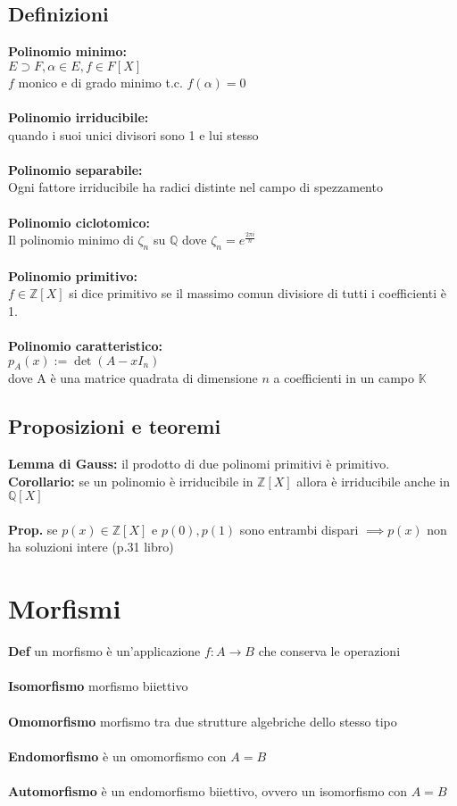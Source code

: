 \documentclass[10pt,a4paper]{article}
\begin{document}
\subsection{Definizioni}
\textbf{Polinomio minimo:}\\
$E \supset F, \alpha \in E,f \in F[X]$\\
$f$ monico e di grado minimo t.c. $f(\alpha)=0$\\\\
\textbf{Polinomio irriducibile:}\\quando i suoi unici divisori sono 1 e lui stesso \\\\
\textbf{Polinomio separabile:} \\Ogni fattore irriducibile ha radici distinte nel campo di spezzamento\\\\
\textbf{Polinomio ciclotomico:}\\
Il polinomio minimo di $\zeta_n$ su $\mathbb{Q}$ dove $\zeta_n = e^{\frac{2\pi i}{n}}$\\\\
\textbf{Polinomio primitivo:}\\
$f\in \mathbb{Z}[X]$ si dice primitivo se il massimo comun divisiore di tutti i coefficienti è 1.\\\\
\textbf{Polinomio caratteristico:}\\
$p_A(x) := \det(A-xI_n)$\\
dove A è una matrice quadrata di dimensione $n$ a coefficienti in un campo $\mathbb{K}$
\subsection{Proposizioni e teoremi}
\textbf{Lemma di Gauss:} il prodotto di due polinomi primitivi è primitivo. \\
\textbf{Corollario:} se un polinomio è irriducibile in $\mathbb{Z}[X]$ allora è irriducibile anche in $\mathbb{Q}[X]$\\\\
\textbf{Prop.} se $p(x) \in \mathbb{Z}[X]$ e $p(0),p(1)$ sono entrambi dispari $\implies p(x)$ non ha soluzioni intere (p.31 libro)
\newpage
\section{Morfismi}
\textbf{Def} un morfismo è un'applicazione $f: A \to B$ che conserva le operazioni\\\\
\textbf{Isomorfismo} morfismo biiettivo\\\\
\textbf{Omomorfismo} morfismo tra due strutture algebriche dello stesso tipo \\\\
\textbf{Endomorfismo} è un omomorfismo con $A=B$\\\\
\textbf{Automorfismo} è un endomorfismo biiettivo, ovvero un isomorfismo con $A=B$\\
\end{document}
